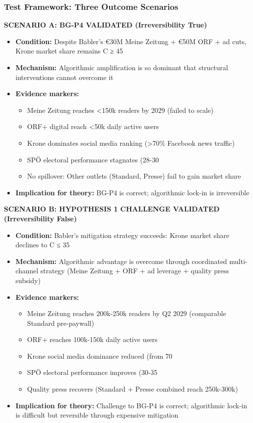 \subsubsection*{Test Framework: Three Outcome Scenarios}

\textbf{SCENARIO A: BG-P4 VALIDATED (Irreversibility True)}
\begin{itemize}
\item \textbf{Condition:} Despite Babler's €30M Meine Zeitung + €50M ORF + ad cuts, Krone market share remains C ≥ 45%
\item \textbf{Mechanism:} Algorithmic amplification is so dominant that structural interventions cannot overcome it
\item \textbf{Evidence markers:}
  \begin{itemize}
  \item Meine Zeitung reaches <150k readers by 2029 (failed to scale)
  \item ORF+ digital reach <50k daily active users
  \item Krone dominates social media ranking (>70\% Facebook news traffic)
  \item SPÖ electoral performance stagnates (28-30%
  \item No spillover: Other outlets (Standard, Presse) fail to gain market share
  \end{itemize}
\item \textbf{Implication for theory:} BG-P4 is correct; algorithmic lock-in is irreversible
\end{itemize}

\textbf{SCENARIO B: HYPOTHESIS 1 CHALLENGE VALIDATED (Irreversibility False)}
\begin{itemize}
\item \textbf{Condition:} Babler's mitigation strategy succeeds: Krone market share declines to C ≤ 35%
\item \textbf{Mechanism:} Algorithmic advantage is overcome through coordinated multi-channel strategy (Meine Zeitung + ORF + ad leverage + quality press subsidy)
\item \textbf{Evidence markers:}
  \begin{itemize}
  \item Meine Zeitung reaches 200k-250k readers by Q2 2029 (comparable Standard pre-paywall)
  \item ORF+ reaches 100k-150k daily active users
  \item Krone social media dominance reduced (from 70%
  \item SPÖ electoral performance improves (30-35%
  \item Quality press recovers (Standard + Presse combined reach 250k-300k)
  \end{itemize}
\item \textbf{Implication for theory:} Challenge to BG-P4 is correct; algorithmic lock-in is difficult but reversible through expensive mitigation
\end{itemize}

